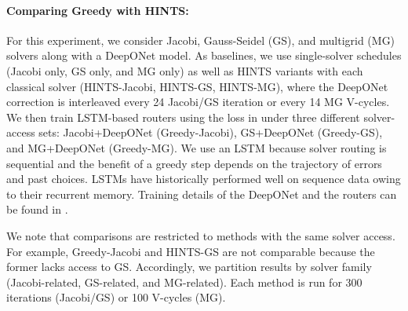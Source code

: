 \documentclass{article} %
\begin{document}
\paragraph{Comparing Greedy with HINTS:} For this experiment, we consider Jacobi, Gauss-Seidel (GS), and multigrid (MG) solvers along with a DeepONet model. As baselines, we use single-solver schedules (Jacobi only, GS only, and MG only) as well as HINTS variants with each classical solver (HINTS-Jacobi, HINTS-GS, HINTS-MG), where the DeepONet correction is interleaved every 24 Jacobi/GS iteration or every 14 MG V-cycles. We then train LSTM-based routers using the loss in  under three different solver-access sets: Jacobi+DeepONet (Greedy-Jacobi), GS+DeepONet (Greedy-GS), 
and MG+DeepONet (Greedy-MG). We use an LSTM because solver routing is sequential and the benefit of a greedy step depends on the trajectory of errors and past choices. LSTMs have historically performed well on sequence data owing to their recurrent memory. Training details of the DeepONet and the routers can be found in . 

We note that comparisons are restricted to methods with the same solver access. For example, Greedy-Jacobi and HINTS-GS are not comparable because the former lacks access to GS. Accordingly, we partition results by solver family (Jacobi-related, GS-related, and MG-related). Each method is run for 300 iterations (Jacobi/GS) or 100 V-cycles (MG).

\end{document}
